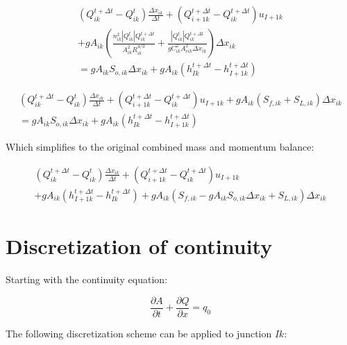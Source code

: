\documentclass[11pt]{article}
\begin{document}
\begin{equation}
  \begin{split}
    (Q_{ik}^{t + \Delta t} - Q_{ik}^t) \frac{\Delta x_{ik}}{\Delta t} + (Q_{i+1k}^{t + \Delta t} - Q_{ik}^{t + \Delta t}) u_{I+1k} \\ + g A_{ik} (\frac{n_{ik}^2 |Q_{ik}^t| Q_{ik}^{t + \Delta t}}{A_{ik}^2 R_{ik}^{4/3}} + \frac{|Q_{ik}^t| Q_{ik}^{t + \Delta t}}{g C_{ik}^2 A_{cik}^2 \Delta x_{ik}}) \Delta x_{ik} \\ =
    g A_{ik} S_{o,ik} \Delta x_{ik} + g A_{ik} (h_{Ik}^{t + \Delta t} - h_{I+1k}^{t + \Delta t})
  \end{split}
\end{equation}


\begin{equation}
  \begin{split}
    (Q_{ik}^{t + \Delta t} - Q_{ik}^t) \frac{\Delta x_{ik}}{\Delta t} + (Q_{i+1k}^{t + \Delta t} - Q_{ik}^{t + \Delta t}) u_{I+1k} + g A_{ik} (S_{f,ik} + S_{L,ik}) \Delta x_{ik} \\ =
    g A_{ik} S_{o,ik} \Delta x_{ik} + g A_{ik} (h_{Ik}^{t + \Delta t} - h_{I+1k}^{t + \Delta t})
  \end{split}
\end{equation}

Which simplifies to the original combined mass and momentum balance:

\begin{equation}
  \begin{split}
    (Q_{ik}^{t + \Delta t} - Q_{ik}^t) \frac{\Delta x_{ik}}{\Delta t} + (Q_{i+1k}^{t + \Delta t} - Q_{ik}^{t + \Delta t}) u_{I+1k} \\ + g A_{ik} (h_{I+1k}^{t + \Delta t} - h_{Ik}^{t + \Delta t}) + g A_{ik} (S_{f,ik} -
    g A_{ik} S_{o,ik} \Delta x_{ik} + S_{L,ik}) \Delta x_{ik}
  \end{split}
\end{equation}

\section{Discretization of continuity}

Starting with the continuity equation:

\begin{equation}
  \frac{\partial A}{\partial t} + \frac{\partial Q}{\partial x} = q_0
\end{equation}

The following discretization scheme can be applied to junction $Ik$:
\end{document}
